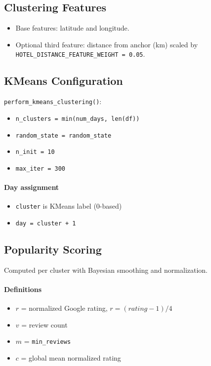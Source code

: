 \documentclass[11pt]{article}
\begin{document}
\subsection{Clustering Features}
\begin{itemize}
  \item Base features: latitude and longitude.
  \item Optional third feature: distance from anchor (km) scaled by \texttt{HOTEL\_DISTANCE\_FEATURE\_WEIGHT = 0.05}.
\end{itemize}

\subsection{KMeans Configuration}
\texttt{perform\_kmeans\_clustering()}:
\begin{itemize}
  \item \texttt{n\_clusters = min(num\_days, len(df))}
  \item \texttt{random\_state = random\_state}
  \item \texttt{n\_init = 10}
  \item \texttt{max\_iter = 300}
\end{itemize}

\paragraph{Day assignment}
\begin{itemize}
  \item \texttt{cluster} is KMeans label (0-based)
  \item \texttt{day = cluster + 1}
\end{itemize}

\subsection{Popularity Scoring}
Computed per cluster with Bayesian smoothing and normalization.

\paragraph{Definitions}
\begin{itemize}
  \item $r$ = normalized Google rating, $r = (rating - 1) / 4$
  \item $v$ = review count
  \item $m$ = \texttt{min\_reviews}
  \item $c$ = global mean normalized rating
\end{itemize}
\end{document}
